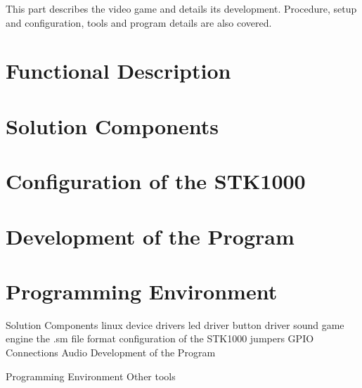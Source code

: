 This part describes the video game and details its development. Procedure, setup and configuration, tools and program details are also covered.
\section{Functional Description}
	

\section{Solution Components}
	

\section{Configuration of the STK1000}
	

\section{Development of the Program}
	

\section{Programming Environment}
	

Solution Components
	linux device drivers
		led driver
		button driver
	sound
	game engine
	the .sm file format
configuration of the STK1000
	jumpers
	GPIO Connections
	Audio
Development of the Program

Programming Environment
	Other tools